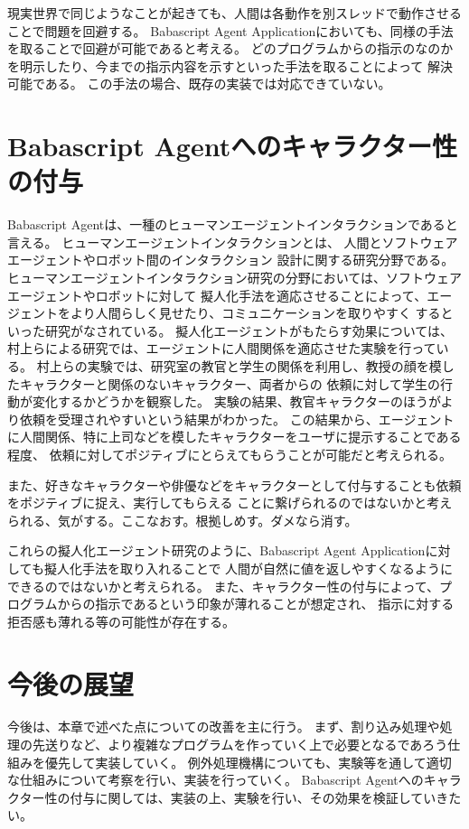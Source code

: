 現実世界で同じようなことが起きても、人間は各動作を別スレッドで動作させることで問題を回避する。
Babascript Agent
Applicationにおいても、同様の手法を取ることで回避が可能であると考える。
どのプログラムからの指示のなのかを明示したり、今までの指示内容を示すといった手法を取ることによって
解決可能である。 この手法の場合、既存の実装では対応できていない。

\section{Babascript
Agentへのキャラクター性の付与}\label{babascript-agentux3078ux306eux30adux30e3ux30e9ux30afux30bfux30fcux6027ux306eux4ed8ux4e0e}

Babascript
Agentは、一種のヒューマンエージェントインタラクションであると言える。
ヒューマンエージェントインタラクションとは、
人間とソフトウェアエージェントやロボット間のインタラクション
設計に関する研究分野である。
ヒューマンエージェントインタラクション研究の分野においては、ソフトウェアエージェントやロボットに対して
擬人化手法を適応させることによって、エージェントをより人間らしく見せたり、コミュニケーションを取りやすく
するといった研究がなされている。
擬人化エージェントがもたらす効果については、村上らによる研究\cite{murakami}では、エージェントに人間関係を適応させた実験を行っている。
村上らの実験では、研究室の教官と学生の関係を利用し、教授の顔を模したキャラクターと関係のないキャラクター、両者からの
依頼に対して学生の行動が変化するかどうかを観察した。
実験の結果、教官キャラクターのほうがより依頼を受理されやすいという結果がわかった。
この結果から、エージェントに人間関係、特に上司などを模したキャラクターをユーザに提示することである程度、
依頼に対してポジティブにとらえてもらうことが可能だと考えられる。

また、好きなキャラクターや俳優などをキャラクターとして付与することも依頼をポジティブに捉え、実行してもらえる
ことに繋げられるのではないかと考えられる、気がする。ここなおす。根拠しめす。ダメなら消す。

これらの擬人化エージェント研究のように、Babascript Agent
Applicationに対しても擬人化手法を取り入れることで
人間が自然に値を返しやすくなるようにできるのではないかと考えられる。
また、キャラクター性の付与によって、プログラムからの指示であるという印象が薄れることが想定され、
指示に対する拒否感も薄れる等の可能性が存在する。

\section{今後の展望}\label{ux4ecaux5f8cux306eux5c55ux671b}

今後は、本章で述べた点についての改善を主に行う。
まず、割り込み処理や処理の先送りなど、より複雑なプログラムを作っていく上で必要となるであろう仕組みを優先して実装していく。
例外処理機構についても、実験等を通して適切な仕組みについて考察を行い、実装を行っていく。
Babascript
Agentへのキャラクター性の付与に関しては、実装の上、実験を行い、その効果を検証していきたい。

